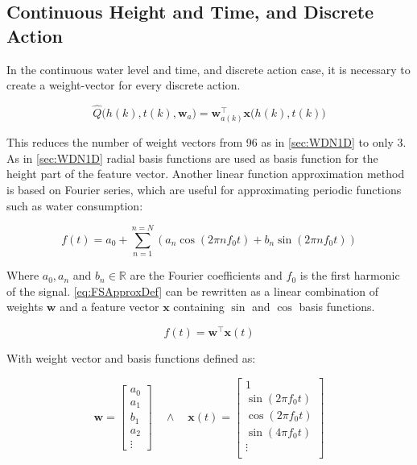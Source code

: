 \clearpage \newpage

\subsection{Continuous Height and Time, and Discrete Action}\label{sec:WDN2D}

In the continuous water level and time, and discrete action case, it is necessary to create a weight-vector for every discrete action. 

\begin{equation}\label{eq:Qhat1Discrete}
	\hat{Q}\bigg(h(k),t(k),\textbf{w}_{a}\bigg)=\textbf{w}_{a(k)}^{\intercal}\textbf{x}\bigg(h(k),t(k)\bigg)
\end{equation}

This reduces the number of weight vectors from 96 as in \cref{sec:WDN1D} to only 3. As in \cref{sec:WDN1D} radial basis functions are used as basis function for the height part of the feature vector. Another linear function approximation method is based on Fourier series, which are useful for approximating periodic functions such as water consumption:

\begin{equation}\label{eq:FSApproxDef}
	f(t)=a_{0}+\sum_{n=1}^{n=N}(a_{n}\cos(2\pi n f_{0} t)+b_{n}\sin(2\pi n f_{0}t))
\end{equation}

Where $ a_0, a_{n} $ and $ b_{n} \in \mathbb{R}$ are the Fourier coefficients and $ f_0 $ is the first harmonic of the signal. \cref{eq:FSApproxDef} can be rewritten as a linear combination of weights $ \textbf{w} $ and a feature vector $ \textbf{x} $ containing $\sin$ and $\cos$ basis functions.

\begin{equation}
	f(t)=\textbf{w}^\intercal\textbf{x}(t)
\end{equation}

With weight vector and basis functions defined as:

\begin{equation}\label{eq:wxFS}
	\textbf{w} = 
	\begin{bmatrix}
		a_{0}\\
		a_{1}\\
		b_{1}\\
		a_{2}\\
		\vdots
	\end{bmatrix}
\quad \wedge \quad
	\textbf{x}(t) = 
	\begin{bmatrix}
		1\\
		\sin(2\pi f_0 t)\\
		\cos(2\pi f_0 t)\\
		\sin(4\pi f_0 t)\\
		\vdots \\
	\end{bmatrix} 
\end{equation}

